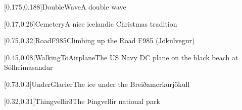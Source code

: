



\graphicspath{{Figures/}{Figures/Iceland/}}


\subtitle{Day 5}
\date{26 June 2026}


    
    [0.175,0.188]{DoubleWave}{A double wave}
    
    
    [0.17,0.26]{Cemetery}{A nice icelandic Christmas tradition}
    
    [0.75,0.32]{RoadF985}{Climbing up the Road F985 (J\"okulvegur)}
    
    
    [0.45,0.08]{WalkingToAirplane}{The US Navy DC plane on the black beach at S\'olheimasandur}
    
    [0.73,0.3]{UnderGlacier}{The ice under the Breiðamerkurj\"okull}
    
    [0.32,0.31]{Thingvellir3}{The Þingvellir national park}
    

